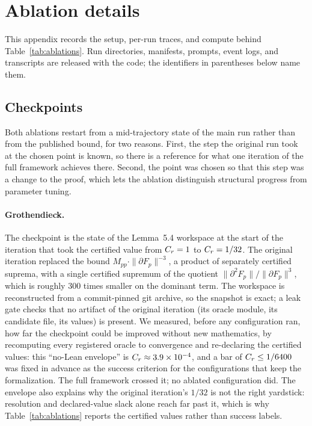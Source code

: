 \section{Ablation details}
\label{app:ablations}

This appendix records the setup, per-run traces, and compute behind
Table~\ref{tab:ablations}. Run directories, manifests, prompts, event logs, and
transcripts are released with the code; the identifiers in parentheses below
name them.

\subsection{Checkpoints}

Both ablations restart from a mid-trajectory state of the main run rather than
from the published bound, for two reasons. First, the step the original run
took at the chosen point is known, so there is a reference for what one
iteration of the full framework achieves there. Second, the point was chosen so
that this step was a change to the proof, which lets the ablation distinguish
structural progress from parameter tuning.

\paragraph{Grothendieck.}
The checkpoint is the state of the Lemma~5.4 workspace at the start of the
iteration that took the certified value from $C_r = 1$ to $C_r = 1/32$. The
original iteration replaced the bound
$M_{pp}\cdot \|\partial F_p\|^{-3}$, a product of separately certified
suprema, with a single certified supremum of the quotient
$\|\partial^2 F_p\| / \|\partial F_p\|^{3}$, which is roughly $300$ times
smaller on the dominant term. The workspace is reconstructed from a
commit-pinned git archive, so the snapshot is exact; a leak gate checks that no
artifact of the original iteration (its oracle module, its candidate file, its
values) is present. We measured, before any configuration ran, how far the
checkpoint could be improved without new mathematics, by recomputing every
registered oracle to convergence and re-declaring the certified values: this
``no-Lean envelope'' is $C_r \approx 3.9\times10^{-4}$, and a bar of
$C_r \le 1/6400$ was fixed in advance as the success criterion for the
configurations that keep the formalization. The full framework crossed it; no
ablated configuration did. The envelope also explains why the original
iteration's $1/32$ is not the right yardstick: resolution and declared-value
slack alone reach far past it, which is why Table~\ref{tab:ablations} reports
the certified values rather than success labels.

